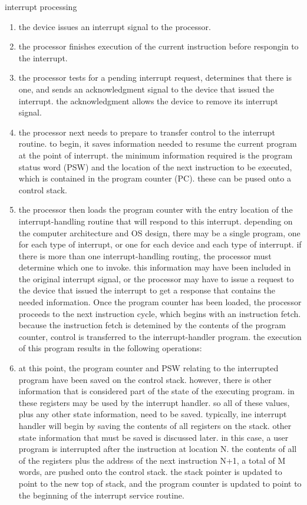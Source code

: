 \documentclass{article}
\begin{document}
interrupt processing
	\begin{enumerate}
		\item the device issues an interrupt signal to the processor.
		\item the processor finishes execution of the current instruction before respongin to the interrupt.
		\item the processor tests for a pending interrupt request, determines that there is one, and sends an acknowledgment signal to the device that issued the interrupt. the acknowledgment allows the device to remove its interrupt signal.
		\item the processor next needs to prepare to transfer control to the interrupt routine. to begin, it saves information needed to resume the current program at the point of interrupt. the minimum information required is the program status word (PSW) and the location of the next instruction to be executed, which is contained in the program counter (PC). these can be pused onto a control stack.
		\item the processor then loads the program counter with the entry location of the interrupt-handling routine that will respond to this interrupt. depending on the computer architecture and OS design, there may be a single program, one for each type of interrupt, or one for each device and each type of interrupt. if there is more than one interrupt-handling routing, the processor must determine which one to invoke. this information may have been included in the original interrupt signal, or the processor may have to issue a request to the device that issued the interrupt to get a response that contains the needed information.
		Once the program counter has been loaded, the processor proceeds to the next instruction cycle, which begins with an instruction fetch. because the instruction fetch is detemined by the contents of the program counter, control is transferred to the interrupt-handler program. the execution of this program results in the following operations:

		\item at this point, the program counter and PSW relating to the interrupted program have been saved on the control stack. however, there is other information that is considered part of the state of the executing program. in these registers may be used by the interrupt handler. so all of these values, plus any other state information, need to be saved. typically, ine interrupt handler will begin by saving the contents of all registers on the stack. other state information that must be saved is discussed later. in this case, a user program is interrupted after the instruction at location N. the contents of all of the registers plus the address of the next instruction N+1, a total of M words, are pushed onto the control stack. the stack pointer is updated to point to the new top of stack, and the program counter is updated to point to the beginning of the interrupt service routine.
		

\end{enumerate}
\end{document}
